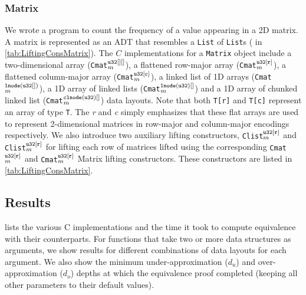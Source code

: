 \subsubsection{Matrix} We wrote a
\SpecL{} program to count the frequency of a value appearing in a 2D matrix.
A matrix is represented as an ADT that resembles a {\tt List} of {\tt List}s ( in \cref{tab:LiftingConsMatrix}).
The $C$ implementations for a {\tt Matrix} object include
a two-dimensional array ({\tt Cmat}$^{\tt u32[][]}_m$), a flattened row-major array ({\tt Cmat}$^{\tt u32[r]}_m$),
a flattened column-major array ({\tt Cmat}$^{\tt u32[c]}_m$), a linked list of 1D arrays ({\tt Cmat}$^{\tt lnode(u32[])}_m$),
a 1D array of linked lists ({\tt Cmat}$^{\tt lnode(u32)[]}_m$) and a 1D array of chunked linked list ({\tt Cmat}$^{\tt clnode(u32)[]}_m$)
data layouts. Note that both {\tt T[r]} and {\tt T[c]} represent an array of type {\tt T}. The {\em r} and {\em c} simply
emphasizes that these flat arrays are used to represent 2-dimensional matrices in row-major and column-major encodings
respectively. We also introduce two auxiliary lifting constructors, {\tt Clist}$_m^{\tt u32[r]}$ and {\tt Clist}$_m^{\tt u32[r]}$
for lifting each row of matrices lifted using the corresponding {\tt Cmat}$_m^{\tt u32[r]}$ and {\tt Cmat}$_m^{\tt u32[r]}$ Matrix lifting
constructors. These constructors are listed in \cref{tab:LiftingConsMatrix}.


\vspace{-12px}
\subsection{Results}
\vspace{-10px}
 lists the various C implementations and the time it took
to compute equivalence with their \SpecL{} counterparts. For functions that
take two or more data structures as arguments, we show
results for different combinations of data layouts for each argument.
We also show the minimum under-approximation ($d_u$) and over-approximation ($d_o$) depths
at which the equivalence proof completed (keeping all other parameters to their
default values).

